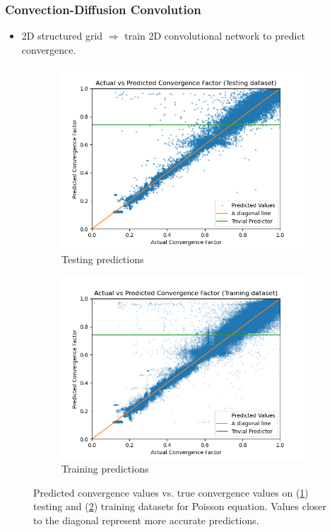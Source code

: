 \documentclass[handout]{beamer}
\begin{document}
\begin{frame}
  \frametitle{Convection-Diffusion Convolution}
  \begin{itemize}
    \item 2D structured grid $\Rightarrow$ train 2D convolutional network to predict convergence.
  \end{itemize}
  \begin{figure}[h]
  \centering
  \begin{subfigure}{.48\textwidth}
    \includegraphics[width=\textwidth]{figures/poisson_conv_test_pred.png}
    \caption{Testing predictions}
    \label{subfig:poisson_conv_test}
  \end{subfigure}
  \begin{subfigure}{.48\textwidth}
    \includegraphics[width=\textwidth]{figures/poisson_conv_train_pred.png}
    \caption{Training predictions}
    \label{subfig:poisson_conv_train}
  \end{subfigure}
  \caption{Predicted convergence values vs. true convergence values on (\ref{subfig:poisson_conv_test}) testing and (\ref{subfig:poisson_conv_train}) training datasets for Poisson equation. Values closer to the diagonal represent more accurate predictions. }
  \label{fig:poisson_conv_pred}
\end{figure}
\end{frame}
\end{document}
